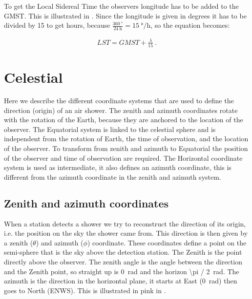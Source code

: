 To get the Local Sidereal Time the observers longitude has to be added
to the GMST. This is illustrated in . Since
the longitude is given in degrees it has to be divided by 15 to get
hours, because $\frac{\SI{360}{\degree}}{\SI{24}{\hour}} =
\SI{15}{\degree\per\hour}$, so the equation becomes:

\begin{equation}
    \begin{array}{l}
        \mathit{LST} = \mathit{GMST} + \frac{\lambda}{15} \ .
    \end{array}
\end{equation}


\section{Celestial}
\label{sec:celestial}

Here we describe the different coordinate systems that are used to
define the direction (origin) of an air shower. The zenith and azimuth
coordinates rotate with the rotation of the Earth, because they are
anchored to the location of the observer. The Equatorial system is
linked to the celestial sphere and is independent from the rotation of
Earth, the time of observation, and the location of the observer. To
transform from zenith and azimuth to Equatorial the position of the
observer and time of observation are required. The Horizontal coordinate
system is used as intermediate, it also defines an azimuth coordinate,
this is different from the azimuth coordinate in the zenith and azimuth
system.


\subsection{Zenith and azimuth coordinates}

When a station detects a shower we try to reconstruct the direction of
its origin, i.e. the position on the sky the shower came from. This
direction is then given by a zenith ($\theta$) and azimuth ($\phi$)
coordinate. These coordinates define a point on the semi-sphere that is
the sky above the detection station. The Zenith is the point directly
above the observer. The zenith angle is the angle between the direction
and the Zenith point, so straight up is \SI{0}{\radian} and the horizon
\SI{\pi / 2}{\radian}. The azimuth is the direction in the horizontal
plane, it starts at East (\SI{0}{\radian}) then goes to North (ENWS).
This is illustrated in pink in .


